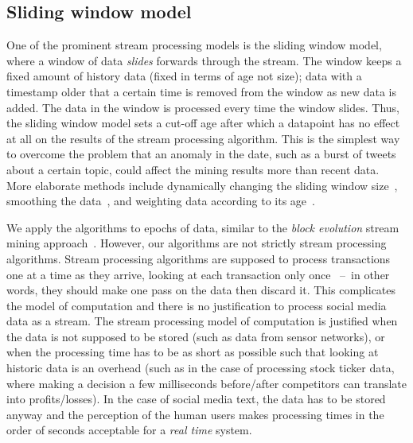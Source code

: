 \documentclass[letterpaper,12pt,titlepage,oneside,final]{book}
\begin{document}
\subsection{Sliding window model}

One of the prominent stream processing models is the sliding window model,
where a window of  data  \emph{slides} forwards through the stream. 
The window keeps a fixed amount of history data (fixed in terms of age not size); 
data with a timestamp older that a certain time is removed from the window 
as new data is added. %
The data in the window is processed every time the window slides.
Thus, the sliding window model sets a cut-off age after which
a datapoint has no effect at all on the results of the stream processing algorithm. %
This is the simplest way to overcome the problem
that an anomaly in the date, 
such as a burst of tweets about a certain topic,
could affect the mining results more than recent data.
More elaborate methods include dynamically changing the 
sliding window size~\cite{bifet2007learning}, 
smoothing the data~\cite{gilbert2001surfing},
and weighting data according to its age~\cite{giannella2003mining}.

We apply the algorithms to epochs of data, 
similar to the \emph{block evolution} stream mining approach~\cite{ganti2002mining,zhu2003efficient}.
However, our algorithms are not strictly stream processing algorithms.
Stream processing algorithms are supposed to process transactions one at a time
as they arrive, looking at each transaction only once
~--~in other words, they should make one pass on the data then discard it.
This complicates the model of computation %
and there is no justification to process social media data as a stream.
The stream processing model of computation is justified when
the data is not supposed to be stored (such as data from sensor networks),
or when the processing time has to be as short as possible 
such that looking at historic data is an overhead 
(such as in the case of processing stock ticker data, 
where making a decision a few milliseconds 
before/after competitors can translate into profits/losses).
In the case of social media text, 
the data has to be stored anyway 
and the perception of the human users
makes processing times in the order of seconds %
acceptable for a \emph{real time} system.
\end{document}

